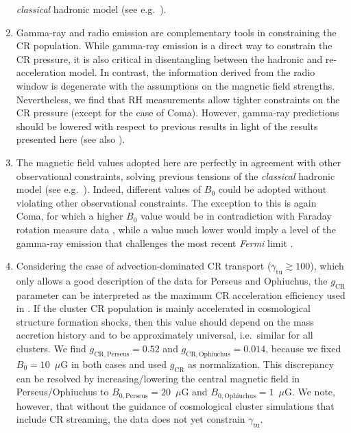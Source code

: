 \documentclass[traditabstract]{aa}
\newcommand{\rmn}{\mathrm}
\begin{document}
\begin{enumerate}
  \emph{classical} hadronic model (see e.g.~\citealp{2010MNRAS.401...47D}).
\item Gamma-ray and radio emission are complementary tools in constraining the
  CR population. While gamma-ray emission is a direct way to constrain the CR
  pressure, it is also critical in disentangling between the hadronic and
  re-acceleration model. In contrast, the information derived from the radio
  window is degenerate with the assumptions on the magnetic field
  strengths. Nevertheless, we find that RH measurements allow tighter constraints
  on the CR pressure (except for the case of Coma).  However, gamma-ray
  predictions should be lowered with respect to previous results
  \citep{2010MNRAS.409..449P,2011arXiv1105.3240P} in light of the results
  presented here (see also \citealp{2011A&A...527A..99E}).
\item The magnetic field values adopted here are perfectly in agreement with
  other observational constraints, solving previous tensions of the
  \emph{classical} hadronic model (see
  e.g.~\citealp{2011ApJ...728...53J}). Indeed, different values of $B_{0}$ could
  be adopted without violating other observational constraints. The exception to
  this is again Coma, for which a higher $B_{0}$ value would be in contradiction
  with Faraday rotation measure data \citep{2010A&A...513A..30B}, while a value
  much lower would imply a level of the gamma-ray emission that challenges the
  most recent {\em Fermi} limit \citep{2012AAS...21920701Z}.
\item Considering the case of advection-dominated CR transport
  ($\gamma_{\rmn{tu}}\gtrsim100$), which only allows a good description of the
  data for Perseus and Ophiuchus, the $g_{\rmn{CR}}$ parameter can be
  interpreted as the maximum CR acceleration efficiency used in
  \cite{2010MNRAS.409..449P}. If the cluster CR population is mainly accelerated
  in cosmological structure formation shocks, then this value should depend on
  the mass accretion history and to be approximately universal, i.e.~similar for
  all clusters. We find $g_{\rmn{CR, Perseus}} = 0.52$ and $g_{\rmn{CR,
      Ophiuchus}} = 0.014$, because we fixed $B_{0}=10$~$\mu$G in both cases and
  used $g_{\rmn{CR}}$ as normalization. This discrepancy can be resolved by
  increasing/lowering the central magnetic field in Perseus/Ophiuchus to
  $B_{0,\rmn{Perseus}}=20$~$\mu$G and $B_{0,\rmn{Ophiuchus}}=1$~$\mu$G. We note,
  however, that without the guidance of cosmological cluster simulations that
  include CR streaming, the data does not yet constrain $\gamma_{\rmn{tu}}$.

\end{enumerate}
\end{document}
